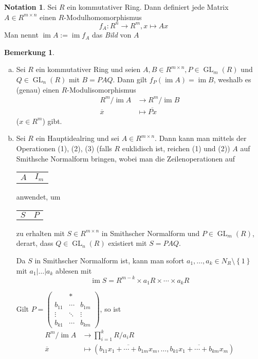 \documentclass[
twoside=semi,
fontsize=12,
DIV=12, 
cleardoublepage=current,
leqno,
headings=optiontoheadandtoc, 
toc=idx
]{scrbook}
\newcommand{\set}[1]{\left\{ #1 \right\}}
\newcommand{\schemaSmithH}[2]{\begin{NiceTabular}[corners={NE,SE}, hvlines]{cc} #1 & #2 \end{NiceTabular}}
\DeclareMathOperator{\im}{im}
\DeclareMathOperator{\GL}{GL}
\theoremstyle{definition}
\newtheorem{bemerkung}[definition]{Bemerkung}
\newtheorem{notation}[definition]{Notation}
\begin{document}
	\begin{notation}\label{1.6.5}\hfill\newline
		Sei $R$ ein kommutativer Ring. Dann definiert jede Matrix $A \in R^{m \times n}$ einen $R$-Modulhomomorphismus
			\[f_A:R^n \to R^m, x \mapsto Ax\]
		Man nennt $\im A := \im f_A$ das \emph{Bild} von $A$
	\end{notation}

	\begin{bemerkung}\label{1.6.6}\hfill
		\begin{enumerate}[(a)]
			\item Sei $R$ ein kommutativer Ring und seien $A, B \in R^{m\times n}, P \in \GL_m(R)$ und \linebreak $Q \in \GL_n(R)$ mit $B=PAQ$. Dann gilt $f_P(\im A) = \im B$, weshalb es (genau) einen $R$-Modulisomorphismus
			\begin{align*}
				R^m/\im A &\to R^m/\im B\\
				\overline{x} &\mapsto \overline{Px}
			\end{align*}
			($x \in R^m$) gibt.
			
			\item Sei $R$ ein Hauptidealring und sei $A \in R^{m\times n}$. Dann kann man mittels der Operationen (1), (2), (3) (falls $R$ euklidisch ist, reichen (1) und (2)) $A$ auf Smithsche Normalform bringen, wobei man die Zeilenoperationen auf \schemaSmithH{$A$}{$I_m$} anwendet, um \schemaSmithH{$S$}{$P$} zu erhalten mit $S \in R^{m \times n}$ in Smithscher Normalform und $P \in \GL_m(R)$, derart, dass $Q \in \GL_n(R)$ existiert mit $S=PAQ$.
		
			Da $S$ in Smithscher Normalform ist, kann man sofort $a_1, \dots, a_k \in N_R \setminus \set{1}$ mit $a_1|\dots|a_k$ ablesen mit
				\[\im S = R^{m-k} \times a_1R \times \cdots \times a_kR\]
				
			Gilt $P = \begin{pmatrix} &*&\\\hline b_{11} &\cdots& b_{1m}\\\vdots&\ddots&\vdots\\ b_{k1} &\cdots & b_{km}\end{pmatrix}$, so ist 
			\begin{align*} 
				R^m/\im A &\to \prod_{i=1}^k R/a_iR\\
				\overline{x} &\mapsto (\overline{b_{11}x_1+\cdots+b_{1m}x_m}, \dots, \overline{b_{k1}x_1+\cdots+b_{km}x_m})
			\end{align*}
		

\end{enumerate}
\end{bemerkung}
\end{document}
